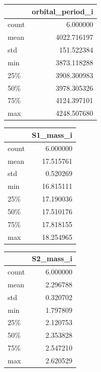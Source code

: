 \documentclass{article}
\theoremstyle{mytheoremstyle}
\theoremstyle{mytheoremstyle}
\theoremstyle{myproblemstyle}
\theoremstyle{myproblemstyle}
\begin{document}
\begin{table}[h]
\centering
  \begin{minipage}[t]{0.3\textwidth}
    \centering
    \begin{tabular}{|l|r|}
    \hline
    & orbital\_period\_i \\
    \hline
      count & 6.000000 \\
      mean & 4022.716197 \\
      std & 151.522384 \\
      min & 3873.118288 \\
      25\% & 3908.300983 \\
      50\% & 3978.305326 \\
      75\% & 4124.397101 \\
      max & 4248.507680 \\
    \hline
    \end{tabular}
  \end{minipage}
  \hfill
  \begin{minipage}[t]{0.3\textwidth}
    \centering
    \begin{tabular}{|l|r|}
    \hline
    & S1\_mass\_i \\
    \hline
      count & 6.000000 \\
      mean & 17.515761 \\
      std & 0.520269 \\
      min & 16.815111 \\
      25\% & 17.190036 \\
      50\% & 17.510176 \\
      75\% & 17.818155 \\
      max & 18.254965 \\
    \hline
    \end{tabular}
  \end{minipage}
  \hfill
  \begin{minipage}[t]{0.3\textwidth}
    \centering
    \begin{tabular}{|l|r|}
    \hline
    & S2\_mass\_i \\
    \hline
      count & 6.000000 \\
      mean & 2.296788 \\
      std & 0.320702 \\
      min & 1.797809 \\
      25\% & 2.120753 \\
      50\% & 2.353828 \\
      75\% & 2.547210 \\
      max & 2.620529 \\
    \hline
    \end{tabular}
  \end{minipage}

\end{table}
\end{document}
